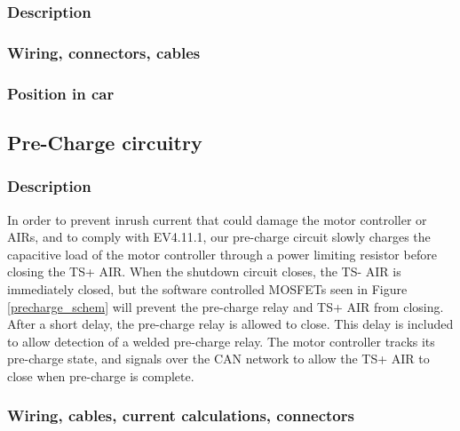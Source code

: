 \documentclass{article}
\begin{document}
\subsubsection{Description}

\subsubsection{Wiring, connectors, cables}

\subsubsection{Position in car}

\subsection{Pre-Charge circuitry}\label{pre_charge_circuitry}
\subsubsection{Description}

In order to prevent inrush current that could damage the motor controller or AIRs, and to comply with EV4.11.1, our pre-charge circuit slowly charges the capacitive load of the motor controller through a power limiting resistor before closing the TS+ AIR. When the shutdown circuit closes, the TS- AIR is immediately closed, but the software controlled MOSFETs seen in Figure \ref{precharge_schem} will prevent the pre-charge relay and TS+ AIR from closing. After a short delay, the pre-charge relay is allowed to close. This delay is included to allow detection of a welded pre-charge relay. The motor controller tracks its pre-charge state, and signals over the CAN network to allow the TS+ AIR to close when pre-charge is complete. 

\subsubsection{Wiring, cables, current calculations, connectors}
\end{document}
